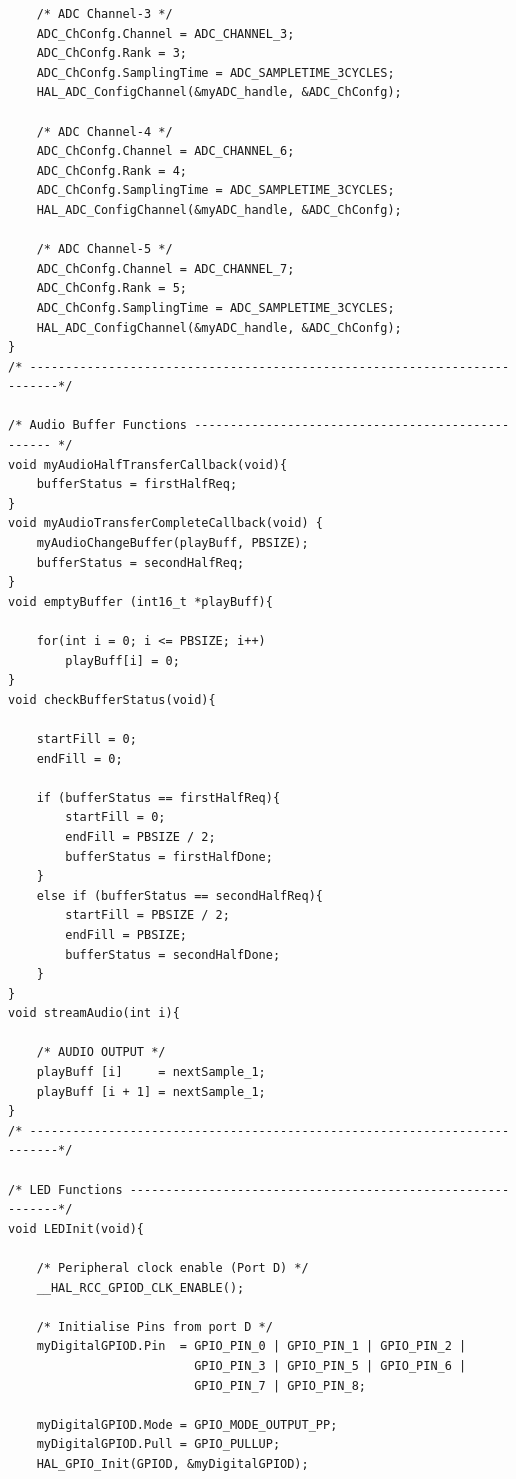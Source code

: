 \documentclass[12pt]{article}
\begin{document}
\begin{verbatim}
    /* ADC Channel-3 */
    ADC_ChConfg.Channel = ADC_CHANNEL_3;
    ADC_ChConfg.Rank = 3;
    ADC_ChConfg.SamplingTime = ADC_SAMPLETIME_3CYCLES;
    HAL_ADC_ConfigChannel(&myADC_handle, &ADC_ChConfg);
    
    /* ADC Channel-4 */
    ADC_ChConfg.Channel = ADC_CHANNEL_6;
    ADC_ChConfg.Rank = 4;
    ADC_ChConfg.SamplingTime = ADC_SAMPLETIME_3CYCLES;
    HAL_ADC_ConfigChannel(&myADC_handle, &ADC_ChConfg);
    
    /* ADC Channel-5 */
    ADC_ChConfg.Channel = ADC_CHANNEL_7;
    ADC_ChConfg.Rank = 5;
    ADC_ChConfg.SamplingTime = ADC_SAMPLETIME_3CYCLES;
    HAL_ADC_ConfigChannel(&myADC_handle, &ADC_ChConfg);
}
/* --------------------------------------------------------------------------*/

/* Audio Buffer Functions -------------------------------------------------- */
void myAudioHalfTransferCallback(void){ 
    bufferStatus = firstHalfReq; 
} 
void myAudioTransferCompleteCallback(void) {    
    myAudioChangeBuffer(playBuff, PBSIZE);    
    bufferStatus = secondHalfReq; 
}
void emptyBuffer (int16_t *playBuff){
	
    for(int i = 0; i <= PBSIZE; i++) 
        playBuff[i] = 0;
}
void checkBufferStatus(void){
	
    startFill = 0;
    endFill = 0;
				
    if (bufferStatus == firstHalfReq){
        startFill = 0;
        endFill = PBSIZE / 2;
        bufferStatus = firstHalfDone;
    }
    else if (bufferStatus == secondHalfReq){
        startFill = PBSIZE / 2;
        endFill = PBSIZE;
        bufferStatus = secondHalfDone;
    }
}
void streamAudio(int i){	
	
    /* AUDIO OUTPUT */ 
    playBuff [i]     = nextSample_1;
    playBuff [i + 1] = nextSample_1;
}
/* --------------------------------------------------------------------------*/

/* LED Functions ------------------------------------------------------------*/
void LEDInit(void){
	
    /* Peripheral clock enable (Port D) */
    __HAL_RCC_GPIOD_CLK_ENABLE();
	
    /* Initialise Pins from port D */
    myDigitalGPIOD.Pin  = GPIO_PIN_0 | GPIO_PIN_1 | GPIO_PIN_2 |
                          GPIO_PIN_3 | GPIO_PIN_5 | GPIO_PIN_6 |
                          GPIO_PIN_7 | GPIO_PIN_8;
											 
    myDigitalGPIOD.Mode = GPIO_MODE_OUTPUT_PP;
    myDigitalGPIOD.Pull = GPIO_PULLUP;
    HAL_GPIO_Init(GPIOD, &myDigitalGPIOD);
	

\end{verbatim}
\end{document}
